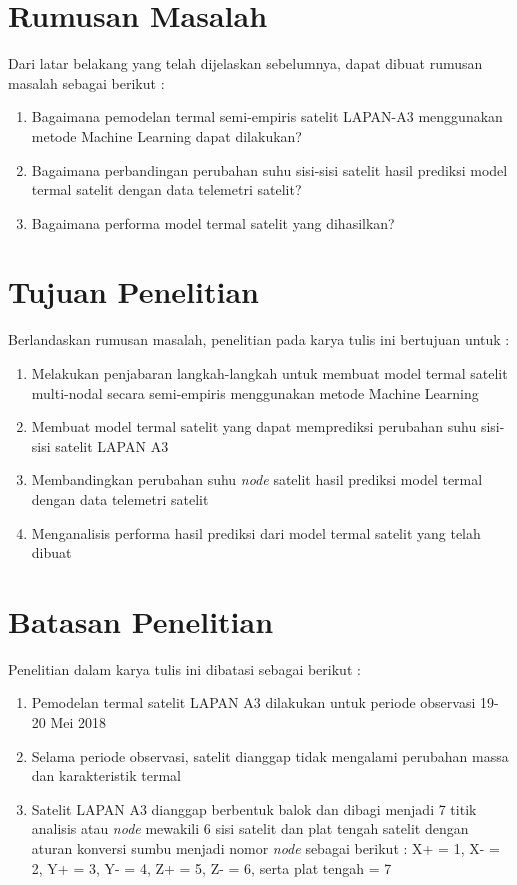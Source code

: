 \section{Rumusan Masalah}

Dari latar belakang yang telah dijelaskan sebelumnya, dapat dibuat rumusan masalah sebagai berikut :

\begin{enumerate}
\item Bagaimana pemodelan termal semi-empiris satelit LAPAN-A3 menggunakan metode Machine Learning dapat dilakukan?
\item Bagaimana perbandingan perubahan suhu sisi-sisi satelit hasil prediksi model termal satelit dengan data telemetri satelit?
\item Bagaimana performa model termal satelit yang dihasilkan?
\end{enumerate}

\section{Tujuan Penelitian}

Berlandaskan rumusan masalah, penelitian pada karya tulis ini bertujuan untuk :

\begin{enumerate}
\item Melakukan penjabaran langkah-langkah untuk membuat model termal satelit multi-nodal secara semi-empiris menggunakan metode Machine Learning
\item Membuat model termal satelit yang dapat memprediksi perubahan suhu sisi-sisi satelit LAPAN A3
\item Membandingkan perubahan suhu \textit{node} satelit hasil prediksi model termal dengan data telemetri satelit
\item Menganalisis performa hasil prediksi dari model termal satelit yang telah dibuat
\end{enumerate}

\section{Batasan Penelitian}

Penelitian dalam karya tulis ini dibatasi sebagai berikut :

\begin{enumerate}
\item Pemodelan termal satelit LAPAN A3 dilakukan untuk periode observasi 19-20 Mei 2018
\item Selama periode observasi, satelit dianggap tidak mengalami perubahan massa dan karakteristik termal
\item Satelit LAPAN A3 dianggap berbentuk balok dan dibagi menjadi 7 titik
	analisis atau \textit{node} mewakili 6 sisi satelit dan plat tengah satelit dengan
		aturan konversi sumbu menjadi nomor \textit{node} sebagai berikut : X+ = 1, X- = 2,
		Y+ = 3, Y- = 4, Z+ = 5, Z- = 6, serta plat tengah = 7
\end{enumerate}

